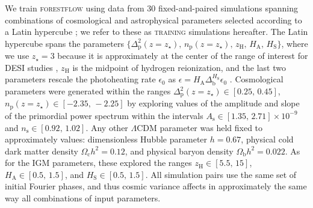 \documentclass[fleqn,usenatbib]{mnras}
\newcommand{\forestflow}{\textsc{forestflow}\xspace}
\newcommand{\lacehc}{\textsc{training}\xspace}
\begin{document}
We train \forestflow using data from 30 fixed-and-paired simulations spanning combinations of cosmological and astrophysical parameters selected according to a Latin hypercube \citep{mckay1979ComparisonThreeMethods}; we refer to these as \lacehc simulations hereafter. The Latin hypercube spans the parameters $\{\Delta^2_\mathrm{p}(z=z_\star),\, n_\mathrm{p}(z=z_\star),\, z_\mathrm{H},\, H_\mathrm{A},\, H_\mathrm{S}\}$, where we use $z_\star=3$ because it is approximately at the center of the range of interest for DESI studies \citep{ravoux2023DarkEnergySpectroscopica, karacayli2024Optimal1DLy}, $z_\mathrm{H}$ is the midpoint of hydrogen reionization, and the last two parameters rescale the  photoheating rate $\epsilon_0$ as $\epsilon = H_\mathrm{A} \Delta_\mathrm{b}^{H_\mathrm{S}} \epsilon_0$ \citep{onorbe2017SelfconsistentModelingReionization}. Cosmological parameters were generated within the ranges $\Delta^2_\mathrm{p}(z=z_\star) \in [0.25,\, 0.45]$, $n_\mathrm{p}(z=z_\star) \in [-2.35,\, -2.25]$ by exploring values of the amplitude and slope of the primordial power spectrum within the intervals $A_\mathrm{s} \in [1.35,\, 2.71]\times 10^{-9}$ and $n_\mathrm{s} \in [0.92,\, 1.02]$. Any other $\Lambda$CDM parameter was held fixed to approximately \citet{planckcollaboration2020Planck2018Resultsa} values: dimensionless Hubble parameter $h=0.67$, physical cold dark matter density $\Omega_\mathrm{c} h^2=0.12$, and physical baryon density $\Omega_\mathrm{b} h^2=0.022$. As for the IGM parameters, these explored the ranges $z_\mathrm{H}\in[5.5,\,15]$, $H_\mathrm{A}\in[0.5,\,1.5]$, and $H_\mathrm{S}\in[0.5,\,1.5]$. All simulation pairs use the same set of initial Fourier phases, and thus cosmic variance affects in approximately the same way all combinations of input parameters.
\end{document}
